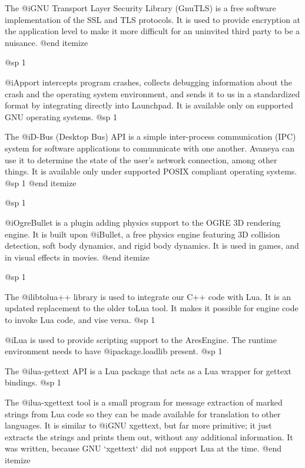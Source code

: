 \item
The @i{GNU Transport Layer Security Library} (GnuTLS) is a free software implementation of the SSL and TLS protocols. It is used to provide encryption at the application level to make it more difficult for an uninvited third party to be a nuisance.
@end itemize

@sp 1

\itemize
\item
@i{Apport} intercepts program crashes, collects debugging information about the crash and the operating system environment, and sends it to us in a standardized format by integrating directly into Launchpad. It is available only on supported GNU operating systems.
@sp 1

\item
The @i{D-Bus} (Desktop Bus) API is a simple inter-process communication (IPC) system for software applications to communicate with one another. Avaneya can use it to determine the state of the user's network connection, among other things. It is available only under supported POSIX compliant operating systems.
@sp 1
@end itemize

@sp 1

\itemize
\item
@i{OgreBullet} is a plugin adding physics support to the OGRE 3D rendering engine. It is built upon @i{Bullet}, a free physics engine featuring 3D collision detection, soft body dynamics, and rigid body dynamics. It is used in games, and in visual effects in movies.
@end itemize


@sp 1

\itemize

\item
The @i{libtolua++} library is used to integrate our C++ code with Lua. It is an updated replacement to the older toLua tool. It makes it possible for engine code to invoke Lua code, and vise versa.
@sp 1

\item
@i{Lua} is used to provide scripting support to the AresEngine. The runtime environment needs to have @i{package.loadlib} present.
@sp 1

\item
The @i{lua-gettext} API is a Lua package that acts as a Lua wrapper for gettext bindings.
@sp 1

\item
The @i{lua-xgettext} tool is a small program for message extraction of marked strings from Lua code so they can be made available for translation to other languages. It is similar to @i{GNU xgettext}, but far more primitive; it just extracts the strings and prints them out, without any additional information. It was written, because GNU `xgettext` did not support Lua at the time.
@end itemize


